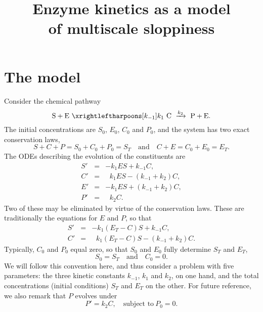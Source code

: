 \documentclass{article}
\title{Enzyme kinetics as a model \\ of multiscale sloppiness}
\author{}
\newcommand{\be}{\begin{equation}}
\newcommand{\ee}{\end{equation}}
\begin{document}
\maketitle

\section{The model}

Consider the chemical pathway
%
\[
 {\rm S + E}
\
 \xrightleftharpoons[k_{-1}]{k_1}
\
 {\rm C}
\
 \xrightarrow{k_2}
\
 {\rm P + E} .
\label{s2c2p}
\]
%
The initial concentrations are
$S_0$, $E_0$, $C_0$ and $P_0$,
and the system has two exact conservation laws,
%
\[
 S+C+P = S_0+C_0+P_0 = S_T
\quad\mbox{and}\quad
 C+E = C_0+E_0 = E_T .
\]
%
The ODEs describing the evolution of the constituents are
%
\be
\begin{array}{rclcl}
 S' &=& -k_1 E S + k_{-1} C ,
\\
 C' &=& \ \ \, k_1 E S - (k_{-1} + k_2) C ,
\\
 E' &=& -k_1 E S + (k_{-1} + k_2) C ,
\\
 P' &=& \ \ \, k_2 C .
\end{array}
\label{SCEP-ODE}
\ee
%
Two of these may be eliminated by virtue of the conservation laws.
These are traditionally the equations for $E$ and $P$,
so that
%
\be
\begin{array}{rclcl}
 S' &=& -k_1 (E_T-C) S + k_{-1} C ,
\\
 C' &=& \ \ \, k_1 (E_T-C) S - (k_{-1} + k_2) C .
\end{array}
\label{SC-ODE}
\ee
%
Typically, $C_0$ and $P_0$ equal zero,
so that $S_0$ and $E_0$ fully determine $S_T$ and $E_T$,
%
\be
 S_0 = S_T
\quad\mbox{and}\quad
 C_0 = 0 .
\label{SC-IP}
\ee
%
We will follow this convention here,
and thus consider a problem with five parameters:
the three kinetic constants $k_{-1}$, $k_1$ and $k_2$,
on one hand, and the total concentrations (initial conditions)
$S_T$ and $E_T$ on the other.
For future reference, we also remark that $P$ evolves under
%
\be
 P' = k_2 C ,
\quad\mbox{subject to}\
 P_0 = 0 .
\label{P-IVP}
\ee
%
\end{document}
